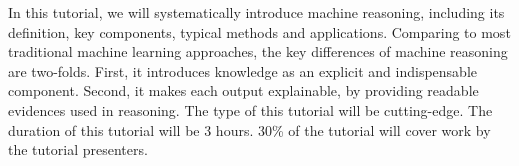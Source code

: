 In this tutorial, we will systematically introduce machine reasoning, including its definition, key components, typical methods and applications. Comparing to most traditional machine learning approaches, the key differences of machine reasoning are two-folds. First, it introduces knowledge as an explicit and indispensable component. Second, it makes each output explainable, by providing readable evidences used in reasoning. The type of this tutorial will be cutting-edge. The duration of this tutorial will be 3 hours. 30\% of the tutorial will cover work by the tutorial presenters.
